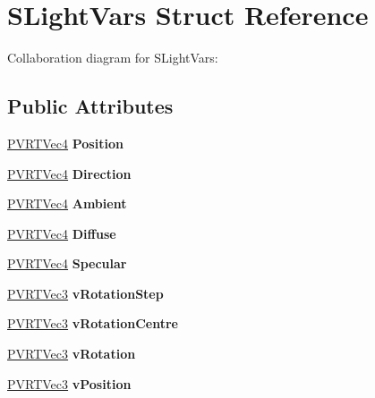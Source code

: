 \hypertarget{struct_s_light_vars}{\section{S\+Light\+Vars Struct Reference}
\label{struct_s_light_vars}
}


Collaboration diagram for S\+Light\+Vars\+:
\subsection*{Public Attributes}
\begin{DoxyCompactItemize}
\item 
\hypertarget{struct_s_light_vars_a7a071fdabb436c4863ec730627829de1}{\hyperlink{struct_p_v_r_t_vec4}{P\+V\+R\+T\+Vec4} {\bfseries Position}}\label{struct_s_light_vars_a7a071fdabb436c4863ec730627829de1}

\item 
\hypertarget{struct_s_light_vars_ac4a3adaae0846b5c9558bb22fe40a9ef}{\hyperlink{struct_p_v_r_t_vec4}{P\+V\+R\+T\+Vec4} {\bfseries Direction}}\label{struct_s_light_vars_ac4a3adaae0846b5c9558bb22fe40a9ef}

\item 
\hypertarget{struct_s_light_vars_a4a173a189ca1ca07f1d55dcc7d843937}{\hyperlink{struct_p_v_r_t_vec4}{P\+V\+R\+T\+Vec4} {\bfseries Ambient}}\label{struct_s_light_vars_a4a173a189ca1ca07f1d55dcc7d843937}

\item 
\hypertarget{struct_s_light_vars_a772bd75b279cf2bbc600557b33164b78}{\hyperlink{struct_p_v_r_t_vec4}{P\+V\+R\+T\+Vec4} {\bfseries Diffuse}}\label{struct_s_light_vars_a772bd75b279cf2bbc600557b33164b78}

\item 
\hypertarget{struct_s_light_vars_af273d6f6d49f239296b5893de8d5027e}{\hyperlink{struct_p_v_r_t_vec4}{P\+V\+R\+T\+Vec4} {\bfseries Specular}}\label{struct_s_light_vars_af273d6f6d49f239296b5893de8d5027e}

\item 
\hypertarget{struct_s_light_vars_a288b1ff0da16d004132cae4452bf44ea}{\hyperlink{struct_p_v_r_t_vec3}{P\+V\+R\+T\+Vec3} {\bfseries v\+Rotation\+Step}}\label{struct_s_light_vars_a288b1ff0da16d004132cae4452bf44ea}

\item 
\hypertarget{struct_s_light_vars_a849f876a405498abf9b6da82b9964232}{\hyperlink{struct_p_v_r_t_vec3}{P\+V\+R\+T\+Vec3} {\bfseries v\+Rotation\+Centre}}\label{struct_s_light_vars_a849f876a405498abf9b6da82b9964232}

\item 
\hypertarget{struct_s_light_vars_ab1d3bde0224f53620eeec9e1fbcc9d22}{\hyperlink{struct_p_v_r_t_vec3}{P\+V\+R\+T\+Vec3} {\bfseries v\+Rotation}}\label{struct_s_light_vars_ab1d3bde0224f53620eeec9e1fbcc9d22}

\item 
\hypertarget{struct_s_light_vars_aad11597fba8d20111da290404e725d72}{\hyperlink{struct_p_v_r_t_vec3}{P\+V\+R\+T\+Vec3} {\bfseries v\+Position}}\label{struct_s_light_vars_aad11597fba8d20111da290404e725d72}

\end{DoxyCompactItemize}


